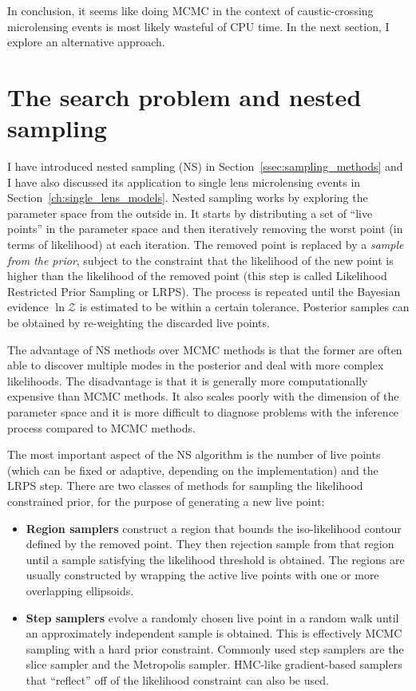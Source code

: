 \documentclass[12pt,dvipsnames]{report}
\begin{document}
In conclusion, it seems like doing MCMC in the context of caustic-crossing 
microlensing events is most likely wasteful of CPU time. 
In the next section, I explore an alternative approach.

\section{The search problem and nested sampling}
\label{sec:binary_lens_ns}
I have introduced nested sampling (NS) in Section~\ref{ssec:sampling_methods} and I have 
also discussed its application to single lens microlensing events in
Section~\ref{ch:single_lens_models}. Nested sampling works by exploring the parameter space 
from the outside in. It starts by distributing a set of ``live points'' in the 
parameter space and then iteratively removing the worst point (in terms of likelihood)
at each iteration. The removed point is replaced by a \emph{sample from the prior}, 
subject to the constraint that the likelihood of the new point is higher than the 
likelihood of the removed point (this step is called Likelihood Restricted Prior 
Sampling or LRPS).
The process is repeated until the Bayesian evidence 
$\ln\mathcal{Z}$ is estimated to be within a certain tolerance. Posterior samples can be 
obtained by re-weighting the discarded live points. 

The advantage of NS methods 
over MCMC methods is that the former are often able to discover multiple modes in the 
posterior and deal with more complex likelihoods. The disadvantage is that it is generally
more computationally expensive than MCMC methods. 
It also scales poorly with the dimension of 
the parameter space and it is more difficult to diagnose problems with the inference process
compared to MCMC methods.

The most important aspect of the NS algorithm is the number of live points (which can be fixed
or adaptive, depending on the implementation) and the LRPS step. There are two classes of methods 
for sampling the likelihood constrained prior, for the purpose of generating a new live point:
\begin{itemize}
    \item \textbf{Region samplers} construct a region that bounds the iso-likelihood contour 
    defined by the removed point. They then rejection sample from that region until a sample 
    satisfying the likelihood threshold is obtained. The regions are usually constructed 
    by wrapping the active live points with one or more overlapping ellipsoids. 
    \item \textbf{Step samplers} evolve a randomly chosen live point in a random walk 
    until an approximately independent sample is obtained. This is effectively MCMC 
    sampling with a hard prior constraint. Commonly used step samplers are the slice sampler
    and the Metropolis sampler. HMC-like gradient-based samplers that 
    ``reflect'' off of the likelihood constraint can also be used.
\end{itemize}
\end{document}
